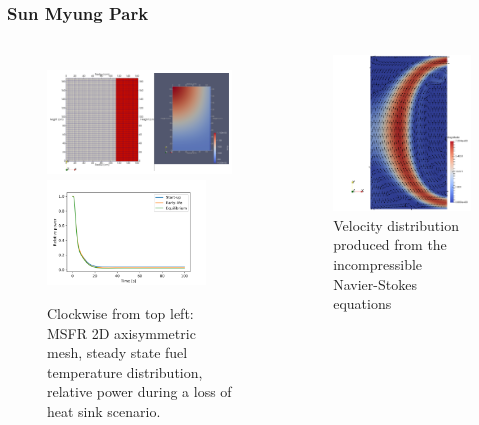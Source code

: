 \begin{frame}
	\frametitle{Sun Myung Park}
		\begin{columns}
			\begin{figure}[htbp!]
				\centering
				\includegraphics[height=2.8cm]{./images/mesh}
      			\includegraphics[height=2.8cm]{./images/loscaheat}
    			\caption{\scriptsize Clockwise from top left: MSFR 2D
    			axisymmetric mesh, steady state fuel temperature distribution,
    			relative power during a loss of heat sink scenario.}
			\end{figure}
			\vspace{.1cm}
			\begin{figure}
				\centering
				\includegraphics[width=.9\textwidth]{./images/ins-flow}
				\caption{\footnotesize Velocity distribution produced from the
				incompressible Navier-Stokes equations}
			\end{figure}
		\end{columns}
\end{frame}